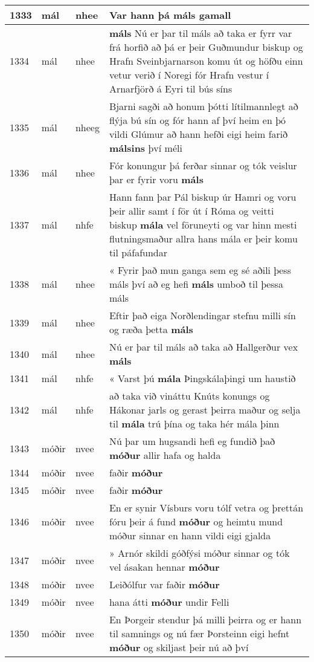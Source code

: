 \documentclass{article}
\begin{document}
\begin{longtable}{p{1cm}|p{1cm}|p{1cm}|p{13cm}}
\hline
1333&mál&nhee&Var hann þá \textbf{máls} gamall\\
\hline
1334&mál&nhee& \textbf{máls} Nú er þar til máls að taka er fyrr var frá horfið að þá er þeir Guðmundur biskup og Hrafn Sveinbjarnarson komu út og höfðu einn vetur verið í Noregi fór Hrafn vestur í Arnarfjörð á Eyri til bús síns\\
\hline
1335&mál&nheeg&Bjarni sagði að honum þótti lítilmannlegt að flýja bú sín og fór hann af því heim en þó vildi Glúmur að hann hefði eigi heim farið \textbf{málsins} því méli\\
\hline
1336&mál&nhee&Fór konungur þá ferðar sinnar og tók veislur þar er fyrir voru \textbf{máls} \\
\hline
1337&mál&nhfe&Hann fann þar Pál biskup úr Hamri og voru þeir allir samt í för út í Róma og veitti biskup \textbf{mála} vel föruneyti og var hinn mesti flutningsmaður allra hans mála er þeir komu til páfafundar\\
\hline
1338&mál&nhee&« Fyrir það mun ganga sem eg sé aðili þess máls því að eg hefi \textbf{máls} umboð til þessa máls\\
\hline
1339&mál&nhee&Eftir það eiga Norðlendingar stefnu milli sín og ræða þetta \textbf{máls} \\
\hline
1340&mál&nhee&Nú er þar til máls að taka að Hallgerður vex \textbf{máls} \\
\hline
1341&mál&nhfe&« Varst þú \textbf{mála} Þingskálaþingi um haustið\\
\hline
1342&mál&nhfe&að taka við vináttu Knúts konungs og Hákonar jarls og gerast þeirra maður og selja til \textbf{mála} trú þína og taka hér mála þinn\\
\hline
1343&móðir&nvee&Nú þar um hugsandi hefi eg fundið það \textbf{móður} allir hafa og halda\\
\hline
1344&móðir&nvee&faðir \textbf{móður} \\
\hline
1345&móðir&nvee&faðir \textbf{móður} \\
\hline
1346&móðir&nvee&En er synir Vísburs voru tólf vetra og þrettán fóru þeir á fund \textbf{móður} og heimtu mund móður sinnar en hann vildi eigi gjalda\\
\hline
1347&móðir&nvee&» Arnór skildi góðfýsi móður sinnar og tók vel ásakan hennar \textbf{móður} \\
\hline
1348&móðir&nvee&Leiðólfur var faðir \textbf{móður} \\
\hline
1349&móðir&nvee&hana átti \textbf{móður} undir Felli\\
\hline
1350&móðir&nvee&En Þorgeir stendur þá milli þeirra og er hann til samnings og nú fær Þorsteinn eigi hefnt \textbf{móður} og skiljast þeir nú að því\\

\end{longtable}
\end{document}
